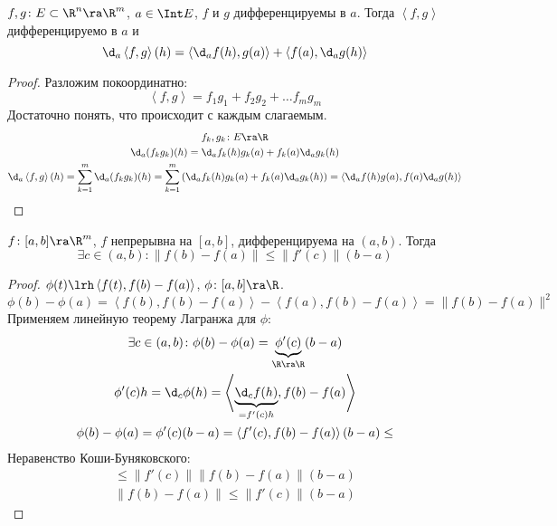 \begin{theorem}
	$f, g\colon E \subset \R^n \ra \R^m$, $a \in \Int E$, $f$ и $g$ дифференцируемы в $a$.
	Тогда $\left<f, g\right>$ дифференцируемо в $a$ и
	\[ \d_a \left<f, g\right>(h) = \left<\d_a f(h), g(a)\right> + \left<f(a), \d_a g(h)\right>\]
\end{theorem}
\begin{proof}
	Разложим покоординатно:
	\[ \left<f, g\right> = f_1 g_1 + f_2 g_2 + \dots f_m g_m \]
	Достаточно понять, что происходит с каждым слагаемым.
	\begin{gather*}
		f_k, g_k\colon E \ra \R \\
		\d_a (f_k g_k)(h) = \d_a f_k(h) g_k(a) + f_k(a) \d_a g_k(h) \\
		\d_a \left<f, g\right>(h) = \sum_{k=1}^m \d_a (f_k g_k)(h) = \sum_{k=1}^m \left(\d_a f_k(h) g_k(a) + f_k(a) \d_a g_k(h)\right) =
			\left<\d_a f(h) g(a), f(a) \d_a g(h)\right>
	\end{gather*}
\end{proof}

\begin{theorem}
	$f\colon [a, b] \ra \R^m$, $f$ непрерывна на $[a, b]$, дифференцируема на $(a, b)$.
	Тогда
	\[ \exists c \in (a, b)\colon \|f(b) - f(a)\| \le \|f'(c)\| (b - a) \]
\end{theorem}
\begin{proof}
	$\phi(t) \lrh \left< f(t), f(b) - f(a) \right>$, $\phi\colon [a, b] \ra \R$.
	\[ \phi(b) - \phi(a) = \left< f(b), f(b) - f(a) \right> - \left< f(a), f(b) - f(a) \right> = \|f(b) - f(a)\|^2 \]
	Применяем линейную теорему Лагранжа для $\phi$:
	\begin{gather*}
		\exists c\in(a, b)\colon \phi(b) - \phi(a) = \underbrace{\phi'(c)}_{\R \ra \R}(b - a) \\
		\phi'(c) h = \d_c \phi(h) = \left<\underbrace{\d_c f(h)}_{=f'(c)h}, f(b) - f(a)\right> \\
		\phi(b) - \phi(a) = \phi'(c)(b - a) = \left<f'(c), f(b) - f(a)\right>(b-a) \le
	\end{gather*}
	Неравенство Коши-Буняковского:
	\begin{gather*}
		\le \|f'(c)\| \|f(b) - f(a)\| (b - a) \\
		\|f(b) - f(a)\| \le \|f'(c)\| (b - a)
	\end{gather*}
\end{proof}

